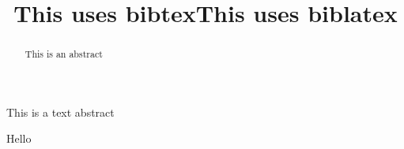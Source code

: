 \documentclass[version=final]{iacrcc}
\title{This uses bibtex}
\title{This uses biblatex}
\begin{document}
\maketitle
\begin{abstract}
This is an abstract
\end{abstract}
\begin{textabstract}
This is a text abstract
\end{textabstract}

Hello \cite{DHMR08}
\cite{hand}
\cite{website}
\cite{turing}
\cite{algorand}
\cite{sealcrypto}
\cite{ong}
\cite{art1}
\cite{EPRINT:KleOneAki23}
\cite{art2}
\cite{DHMR08}
\ifusebibtex
 
\else
 \printbibliography
\fi
\end{document}
